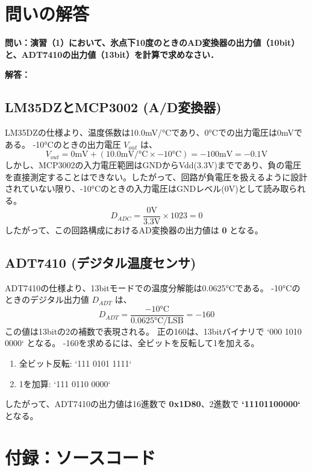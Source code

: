 \documentclass[a4paper,11pt,dvipdfmx]{jsarticle}
\begin{document}
\section{問いの解答}
\textbf{問い：演習（1）において、氷点下10度のときのAD変換器の出力値（10bit）と、ADT7410の出力値（13bit）を計算で求めなさい．}

\textbf{解答：}
\subsection{LM35DZとMCP3002 (A/D変換器)}
LM35DZの仕様より、温度係数は10.0mV/°Cであり、0°Cでの出力電圧は0mVである。
-10°Cのときの出力電圧 $V_{out}$ は、
\begin{equation}
V_{out} = 0 \text{mV} + (10.0 \text{mV/°C} \times -10 \text{°C}) = -100 \text{mV} = -0.1 \text{V}
\end{equation}
しかし、MCP3002の入力電圧範囲はGNDからVdd(3.3V)までであり、負の電圧を直接測定することはできない。したがって、回路が負電圧を扱えるように設計されていない限り、-10°Cのときの入力電圧はGNDレベル(0V)として読み取られる。
\begin{equation}
D_{ADC} = \frac{0 \text{V}}{3.3 \text{V}} \times 1023 = 0
\end{equation}
したがって、この回路構成におけるAD変換器の出力値は \textbf{0} となる。

\subsection{ADT7410 (デジタル温度センサ)}
ADT7410の仕様より、13bitモードでの温度分解能は0.0625°Cである。
-10°Cのときのデジタル出力値 $D_{ADT}$ は、
\begin{equation}
D_{ADT} = \frac{-10 \text{°C}}{0.0625 \text{°C/LSB}} = -160
\end{equation}
この値は13bitの2の補数で表現される。
正の160は、13bitバイナリで `000 1010 0000` となる。
-160を求めるには、全ビットを反転して1を加える。
\begin{enumerate}
    \item 全ビット反転: `111 0101 1111`
    \item 1を加算: `111 0110 0000`
\end{enumerate}
したがって、ADT7410の出力値は16進数で \textbf{0x1D80}、2進数で \textbf{`11101100000`} となる。

\newpage
\section{付録：ソースコード}
\end{document}
